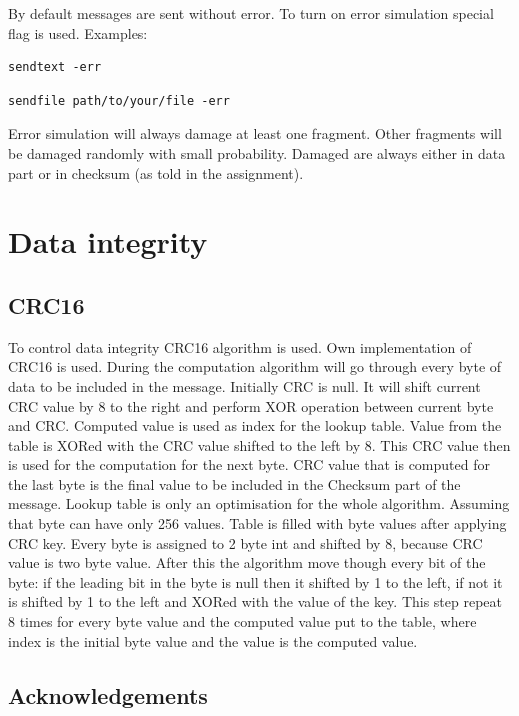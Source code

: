 \documentclass{article}
\begin{document}
By default messages are sent without error. To turn on error simulation special flag is used. Examples:
\begin{lstlisting}
sendtext -err
\end{lstlisting}
\begin{lstlisting}
sendfile path/to/your/file -err
\end{lstlisting}

Error simulation will always damage at least one fragment. Other fragments will be damaged randomly with small probability. Damaged are always either in data part or in checksum (as told in the assignment).

\newpage

\section{Data integrity}


\subsection{CRC16}

To control data integrity CRC16 algorithm is used. 
Own implementation of CRC16 is used.
During the computation algorithm will go  through every byte of data to be included in the message. Initially CRC is null. It will shift current CRC value by 8 to the right and perform XOR operation between current byte and CRC. Computed value is used as index for the lookup table. Value from the table is XORed with the CRC value shifted to the left by 8. This CRC value then is used for the computation for the next byte. CRC value that is computed for the last byte is the final value to be included in the Checksum part of the message. \newline
Lookup table is only an optimisation for the whole algorithm. Assuming that byte can have only 256 values.
Table is filled with byte values after applying CRC key. Every byte is assigned to 2 byte int and shifted by 8, because CRC value is two byte value. After this the algorithm move though every bit of the byte: if the leading bit in the byte is null then it shifted by 1 to the left, if not it is shifted by 1 to the left and XORed with the value of the key. This step repeat 8 times for every byte value and the computed value put to the table, where index is the initial byte value and the value is the computed value.

\subsection{Acknowledgements}
\end{document}
